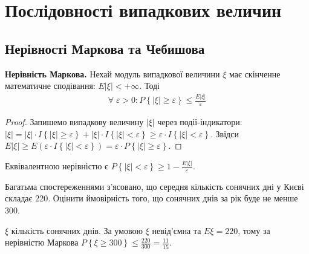 \section{Послідовності випадкових величин}
\subsection{Нерівності Маркова та Чебишова}
\noindent\textbf{Нерівність Маркова.} Нехай модуль випадкової величини $\xi$ має скінченне математичне сподівання: $E|\xi| < +\infty$.
Тоді 
\begin{gather}\label{Markov_ineq}
    \forall \; \varepsilon >0 : P\left\{ |\xi| \geq \varepsilon\right\} \leq \frac{E|\xi|}{\varepsilon}
\end{gather}
\begin{proof}
    Запишемо випадкову величину $|\xi|$ через події-індикатори: 
    $|\xi| = |\xi|\cdot I\left\{|\xi| \geq \varepsilon\right\} + |\xi|\cdot I\left\{|\xi| < \varepsilon\right\} \geq
    \varepsilon\cdot I\left\{|\xi| < \varepsilon\right\}$. Звідси $E|\xi| \geq E \left( \varepsilon\cdot I\left\{|\xi| < \varepsilon\right\}\right) =
    \varepsilon \cdot P\left\{ |\xi| \geq \varepsilon\right\}$.
\end{proof}
\begin{remark}
    Еквівалентною нерівністю є $P\left\{ |\xi| < \varepsilon\right\} \geq 1 - \frac{E|\xi|}{\varepsilon}$.
\end{remark}

\begin{example}
    Багатьма спостереженнями з'ясовано, що середня кількість
    сонячних дні у Києві складає 220. Оцінити ймовірність того, що
    сонячних днів за рік буде не менше 300.

     $\xi$ кількість сонячних днів. За умовою $\xi$ невід'ємна та $E\xi = 220$,
    тому за нерівністю Маркова $P\left\{ \xi \geq 300\right\} \leq \frac{220}{300} = \frac{11}{15}$.
\end{example}

